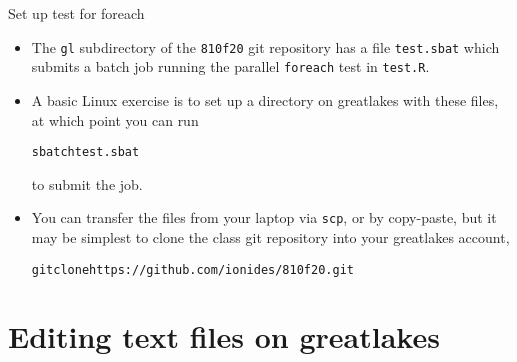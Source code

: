 \begin{frame}[fragile]{Set up test for foreach} 

\begin{itemize}
\item
The \texttt{gl} subdirectory of the \texttt{810f20} git repository has a file \texttt{test.sbat} which submits a batch job running the parallel \texttt{foreach} test in \texttt{test.R}.
\item
A basic Linux exercise is to set up a directory on greatlakes with these files, at which point you can run
\begin{knitrout}\small
{}\color{fgcolor}\begin{kframe}
\begin{alltt}
sbatch test.sbat
\end{alltt}
\end{kframe}
\end{knitrout}
to submit the job.
\item You can transfer the files from your laptop via \texttt{scp}, or by copy-paste, but it may be simplest to clone the class git repository into your greatlakes account,
\begin{knitrout}\small
{}\color{fgcolor}\begin{kframe}
\begin{alltt}
git clone https://github.com/ionides/810f20.git
\end{alltt}
\end{kframe}
\end{knitrout}
\end{itemize}

\end{frame}

\section{Editing text files on greatlakes}

